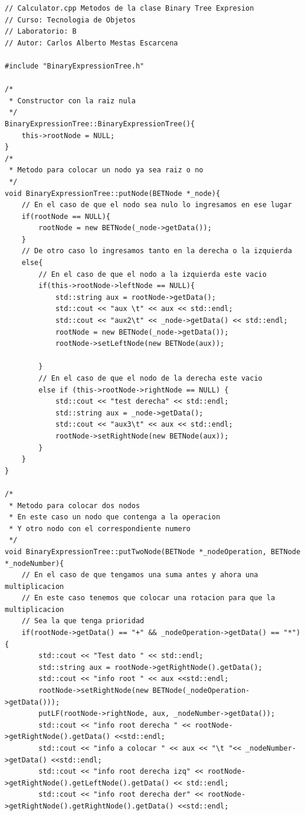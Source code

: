\documentclass[a4paper,12pt]{article}
\begin{document}
\begin{verbatim} 
// Calculator.cpp Metodos de la clase Binary Tree Expresion
// Curso: Tecnologia de Objetos
// Laboratorio: B
// Autor: Carlos Alberto Mestas Escarcena

#include "BinaryExpressionTree.h"

/*
 * Constructor con la raiz nula
 */
BinaryExpressionTree::BinaryExpressionTree(){
    this->rootNode = NULL;
}
/*
 * Metodo para colocar un nodo ya sea raiz o no
 */
void BinaryExpressionTree::putNode(BETNode *_node){
    // En el caso de que el nodo sea nulo lo ingresamos en ese lugar
    if(rootNode == NULL){
        rootNode = new BETNode(_node->getData());
    }
    // De otro caso lo ingresamos tanto en la derecha o la izquierda
    else{
        // En el caso de que el nodo a la izquierda este vacio
        if(this->rootNode->leftNode == NULL){
            std::string aux = rootNode->getData();
            std::cout << "aux \t" << aux << std::endl;
            std::cout << "aux2\t" << _node->getData() << std::endl;
            rootNode = new BETNode(_node->getData());
            rootNode->setLeftNode(new BETNode(aux));

        }
        // En el caso de que el nodo de la derecha este vacio
        else if (this->rootNode->rightNode == NULL) {
            std::cout << "test derecha" << std::endl;
            std::string aux = _node->getData();
            std::cout << "aux3\t" << aux << std::endl;
            rootNode->setRightNode(new BETNode(aux));
        }
    }
}

/*
 * Metodo para colocar dos nodos
 * En este caso un nodo que contenga a la operacion
 * Y otro nodo con el correspondiente numero
 */
void BinaryExpressionTree::putTwoNode(BETNode *_nodeOperation, BETNode *_nodeNumber){
    // En el caso de que tengamos una suma antes y ahora una multiplicacion
    // En este caso tenemos que colocar una rotacion para que la multiplicacion
    // Sea la que tenga prioridad
    if(rootNode->getData() == "+" && _nodeOperation->getData() == "*"){
        std::cout << "Test dato " << std::endl;
        std::string aux = rootNode->getRightNode().getData();
        std::cout << "info root " << aux <<std::endl;
        rootNode->setRightNode(new BETNode(_nodeOperation->getData()));
        putLF(rootNode->rightNode, aux, _nodeNumber->getData());
        std::cout << "info root derecha " << rootNode->getRightNode().getData() <<std::endl;
        std::cout << "info a colocar " << aux << "\t "<< _nodeNumber->getData() <<std::endl;
        std::cout << "info root derecha izq" << rootNode->getRightNode().getLeftNode().getData() << std::endl;
        std::cout << "info root derecha der" << rootNode->getRightNode().getRightNode().getData() <<std::endl;


\end{verbatim}
\end{document}
